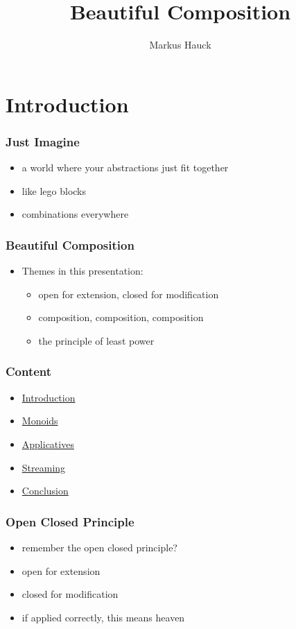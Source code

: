 \documentclass[aspectratio=169]{beamer}
\title{Beautiful Composition}
\author{Markus Hauck}
\begin{document}
\begin{frame}
  \titlepage{}
\end{frame}

\section{Introduction}\label{sec:introduction}

\begin{frame}
  \frametitle{Just Imagine}
  \begin{itemize}
  \item a world where your abstractions just fit together
  \item like lego blocks
  \item combinations everywhere
  \end{itemize}
\end{frame}

\begin{frame}
  \frametitle{Beautiful Composition}
  \begin{itemize}
  \item Themes in this presentation:
    \begin{itemize}
    \item open for extension, closed for modification
    \item composition, composition, composition
    \item the principle of least power
    \end{itemize}
  \end{itemize}
\end{frame}

\begin{frame}
  \frametitle{Content}
  \begin{itemize}
  \item \hyperref[sec:introduction]{Introduction}
  \item \hyperref[sec:monoids]{Monoids}
  \item \hyperref[sec:applicatives]{Applicatives}
  \item \hyperref[sec:streaming]{Streaming}
  \item \hyperref[sec:conclusion]{Conclusion}
  \end{itemize}
\end{frame}

\begin{frame}
  \frametitle{Open Closed Principle}
  \begin{itemize}
  \item remember the open closed principle?
  \item open for extension
  \item closed for modification
  \item if applied correctly, this means heaven
  \end{itemize}
\end{frame}
\end{document}
